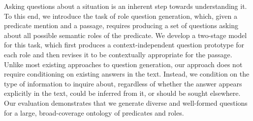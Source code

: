 Asking questions about a situation is an inherent step towards understanding it. To this end, we introduce the task of role question generation, which, given a predicate mention and a passage, requires producing a set of questions asking about all possible semantic roles of the predicate. We develop a two-stage model for this task, which first produces a context-independent question prototype for each role and then revises it to be contextually appropriate for the passage. Unlike most existing approaches to question generation, our approach does not require conditioning on existing answers in the text. Instead, we condition on the type of information to inquire about, regardless of whether the answer appears explicitly in the text, could be inferred from it, or should be sought elsewhere. Our evaluation demonstrates that we generate diverse and well-formed questions for a large, broad-coverage ontology of predicates and roles.
